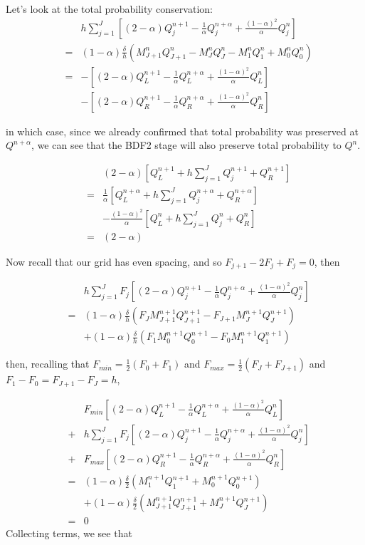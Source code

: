\documentclass[]{rAMF2e}
\begin{document}
Let's look at the total probability conservation:
\begin{eqnarray}
& &h\sum_{j=1}^J \left[(2-\alpha)Q_j^{n+1}-\frac{1}{\alpha}Q_j^{n+\alpha}+\frac{(1-\alpha)^2}{\alpha}Q_j^n\right]\\
&=& (1-\alpha)\frac{\delta}{h}\left(M_{J+1}^{n}Q_{J+1}^{n}-M_{J}^{n}Q_{J}^{n}-
M_{1}^{n}Q_{1}^{n}+M_{0}^{n}Q_{0}^{n}\right)\\
&=&-\left[(2-\alpha)Q_L^{n+1}-\frac{1}{\alpha}Q_L^{n+\alpha}+\frac{(1-\alpha)^2}{\alpha}Q_L^n\right]\\
& &-\left[(2-\alpha)Q_R^{n+1}-\frac{1}{\alpha}Q_R^{n+\alpha}+\frac{(1-\alpha)^2}{\alpha}Q_R^n\right]
\end{eqnarray}

in which case, since we already confirmed that total probability was preserved at $Q^{n+\alpha}$, we can see that the BDF2 stage will also preserve total probability to $Q^n$.

\begin{eqnarray}
& &(2-\alpha)\left[Q_L^{n+1} + h\sum_{j=1}^J Q_j^{n+1} +Q_R^{n+1}\right]\\
&=&\frac{1}{\alpha}\left[Q_L^{n+\alpha} + h\sum_{j=1}^J Q_j^{n+\alpha} +Q_R^{n+\alpha}\right]\\
& &-\frac{(1-\alpha)^2}{\alpha}\left[Q_L^{n} + h\sum_{j=1}^J Q_j^{n} +Q_R^{n}\right]\\
&=& (2-\alpha)
\end{eqnarray}

Now recall that our grid has even spacing, and so $F_{j+1}-2F_j+F_j=0$, then

\begin{eqnarray}
& &h\sum_{j=1}^J F_j\left[(2-\alpha)Q_j^{n+1}-\frac{1}{\alpha}Q_j^{n+\alpha}+\frac{(1-\alpha)^2}{\alpha}Q_j^n\right]\\
&=&(1-\alpha)\frac{\delta}{h}\left(F_JM_{J+1}^{n+1}Q_{J+1}^{n+1}-F_{J+1}M_J^{n+1}Q_J^{n+1}\right)\\
& &+ (1-\alpha)\frac{\delta}{h}\left(F_1M_{0}^{n+1}Q_{0}^{n+1}-F_{0}M_1^{n+1}Q_1^{n+1}\right)
\end{eqnarray}

then, recalling that $F_{min}=\frac{1}{2}(F_0+F_1)$ and $F_{max}=\frac{1}{2}(F_J+F_{J+1})$ and $F_1-F_0=F_{J+1}-F_{J}=h$, 

\begin{eqnarray}
& &F_{min}\left[(2-\alpha)Q_L^{n+1}-\frac{1}{\alpha}Q_L^{n+\alpha}+\frac{(1-\alpha)^2}{\alpha}Q_L^n\right]\\
&+& h\sum_{j=1}^J F_j\left[(2-\alpha)Q_j^{n+1}-\frac{1}{\alpha}Q_j^{n+\alpha}+\frac{(1-\alpha)^2}{\alpha}Q_j^n\right]\\
&+&F_{max}\left[(2-\alpha)Q_R^{n+1}-\frac{1}{\alpha}Q_R^{n+\alpha}+\frac{(1-\alpha)^2}{\alpha}Q_R^n\right]\\
&=&(1-\alpha)\frac{\delta}{2}\left(M^{n+1}_1Q_1^{n+1}+M_0^{n+1}Q_0^{n+1}\right)\\
& &+(1-\alpha)\frac{\delta}{2}\left(M^{n+1}_{J+1}Q_{J+1}^{n+1}+M_J^{n+1}Q_J^{n+1}\right)\\
&=&0
\end{eqnarray}
Collecting terms, we see that
\end{document}
